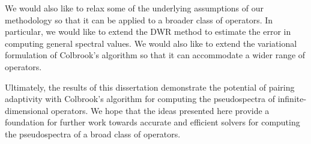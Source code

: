  We would also like to relax some of the underlying assumptions of our methodology so that it can be applied to a broader class of operators. In particular, we would like to extend the DWR method to estimate the error in computing general spectral values. We would also like to extend the variational formulation of Colbrook's algorithm so that it can accommodate a wider range of operators. 

 
 

 Ultimately, the results of this dissertation demonstrate the potential of pairing adaptivity with Colbrook's algorithm for computing the pseudospectra of infinite-dimensional operators. We hope that the ideas presented here provide a foundation for further work towards accurate and efficient solvers for computing the pseudospectra of a broad class of operators.








